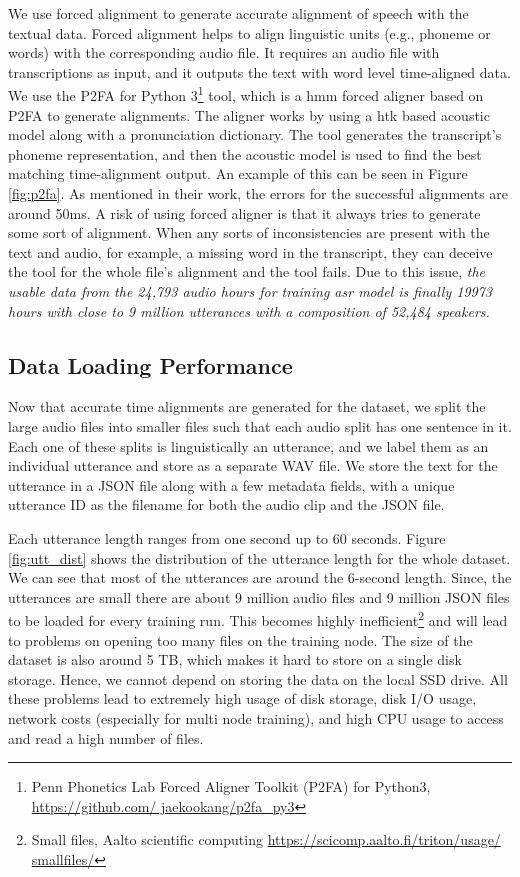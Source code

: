 We use forced alignment to generate accurate alignment of speech with the textual data. Forced alignment helps to align linguistic units (e.g., phoneme or words) with the corresponding audio file. It requires an audio file with transcriptions as input, and it outputs the text with word level time-aligned data. We use the P2FA for Python 3\footnote{Penn Phonetics Lab Forced Aligner Toolkit (P2FA) for Python3, \href{https://github.com/jaekookang/p2fa\_py3}{https://github.com/ jaekookang/p2fa\_py3}} tool, which is a \acrshort{hmm} forced aligner based on P2FA \cite{Yuan2008SPEAKERCORPUS} to generate alignments. The aligner works by using a \acrshort{htk} \cite{Young2002TheBook} based acoustic model along with a pronunciation dictionary. The tool generates the transcript's phoneme representation, and then the acoustic model is used to find the best matching time-alignment output. An example of this can be seen in Figure \ref{fig:p2fa}. As mentioned in their work, the errors for the successful alignments are around 50ms. A risk of using forced aligner is that it always tries to generate some sort of alignment. When any sorts of inconsistencies are present with the text and audio, for example, a missing word in the transcript, they can deceive the tool for the whole file's alignment and the tool fails. Due to this issue, \emph{the usable data from the 24,793 audio hours for training \acrshort{asr} model is finally 19973 hours with close to 9 million utterances with a composition of 52,484 speakers.}

\subsection{Data Loading Performance}
Now that accurate time alignments are generated for the dataset, we split the large audio files into smaller files such that each audio split has one sentence in it. Each one of these splits is linguistically an utterance, and we label them as an individual utterance and store as a separate WAV file. We store the text for the utterance in a JSON file along with a few metadata fields, with a unique utterance ID as the filename for both the audio clip and the JSON file.

Each utterance length ranges from one second up to 60 seconds. Figure \ref{fig:utt_dist} shows the distribution of the utterance length for the whole dataset. We can see that most of the utterances are around the 6-second length. Since, the utterances are small there are about 9 million audio files and 9 million JSON files to be loaded for every training run. This becomes highly inefficient\footnote{Small files, Aalto scientific computing \href{https://scicomp.aalto.fi/triton/usage/smallfiles/}{https://scicomp.aalto.fi/triton/usage/ smallfiles/}} and will lead to problems on opening too many files on the training node. The size of the dataset is also around 5 TB, which makes it hard to store on a single disk storage. Hence, we cannot depend on storing the data on the local SSD drive. All these problems lead to extremely high usage of disk storage, disk I/O usage, network costs (especially for multi node training), and high CPU usage to access and read a high number of files. 


